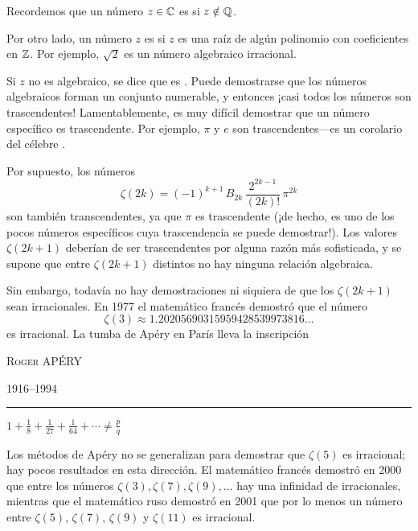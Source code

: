 \documentclass{article}
\begin{document}
\begin{shaded}
Recordemos que un número $z\in \mathbb{C}$ es  si $z \notin \mathbb{Q}$.

Por otro lado, un número $z$ es  si $z$ es una raíz de algún polinomio con coeficientes en $\mathbb{Z}$. Por ejemplo, $\sqrt{2}$ es un número algebraico irracional.

Si $z$ no es algebraico, se dice que es . Puede demostrarse que los números algebraicos forman un conjunto numerable, y entonces ¡casi todos los números son trascendentes! Lamentablemente, es muy difícil demostrar que un número específico es trascendente. Por ejemplo, $\pi$ y $e$ son trascendentes---es un corolario del célebre .
\end{shaded}

Por supuesto, los números
$$\zeta (2k) = (-1)^{k+1} \, B_{2k}\,\frac{2^{2k-1}}{(2k)!}\,\pi^{2k}$$
son también transcendentes, ya que $\pi$ es trascendente (¡de hecho, es uno de los pocos números específicos cuya trascendencia se puede demostrar!). Los valores $\zeta (2k+1)$ deberían de ser trascendentes por alguna razón más sofisticada, y se supone que entre $\zeta (2k+1)$ distintos no hay ninguna relación algebraica.

Sin embargo, todavía no hay demostraciones ni siquiera de que los $\zeta (2k+1)$ sean irracionales. En 1977 el matemático francés  demostró que el número
$$\zeta (3) \approx 1.20205690315959428539973816\ldots$$
es irracional. La tumba de Apéry en París lleva la inscripción

\begin{center}
\noindent\textsc{Roger APÉRY}

\noindent\textsc{1916--1994}

\vspace{0.7em}

\noindent\rule{1cm}{0.4mm}

\vspace{1em}

\noindent$1 + \frac{1}{8} + \frac{1}{27} + \frac{1}{64} + \cdots \ne \frac{p}{q}$
\end{center}

Los métodos de Apéry no se generalizan para demostrar que $\zeta (5)$ es irracional; hay pocos resultados en esta dirección. El matemático francés  demostró en 2000 que entre los números $\zeta (3), \zeta (7), \zeta (9), \ldots$ hay una infinidad de irracionales, mientras que el matemático ruso  demostró en 2001 que por lo menos un número entre $\zeta(5)$, $\zeta(7)$, $\zeta(9)$ y $\zeta(11)$ es irracional.
\end{document}
